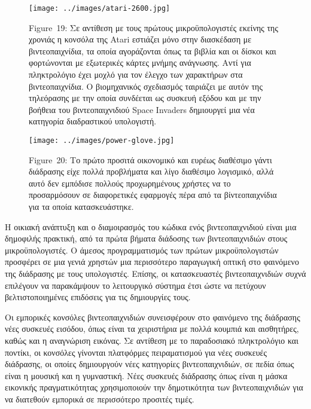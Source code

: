 \documentclass[
]{article}
\begin{document}
\leavevmode{}%
\begin{figure}
\hypertarget{fig:atari-2600}{%
\centering
\texttt{[image: ../images/atari-2600.jpg]}
\caption{Figure~19: Σε αντίθεση με τους πρώτους μικροϋπολογιστές εκείνης
της χρονιάς η κονσόλα της Atari εστιάζει μόνο στην διασκέδαση με
βιντεοπαιχνίδια, τα οποία αγοράζονται όπως τα βιβλία και οι δίσκοι και
φορτώνονται με εξωτερικές κάρτες μνήμης ανάγνωσης. Αντί για πληκτρολόγιο
έχει μοχλό για τον έλεγχο των χαρακτήρων στα βιντεοπαιχνίδια. Ο
βιομηχανικός σχεδιασμός ταιριάζει με αυτόν της τηλεόρασης με την οποία
συνδέεται ως συσκευή εξόδου και με την βοήθεια του βιντεοπαιχνιδιού
Space Invaders δημιουργεί μια νέα κατηγορία διαδραστικού
υπολογιστή.}\label{fig:atari-2600}
}
\end{figure}

\leavevmode{}%
\begin{figure}
\hypertarget{fig:power-glove}{%
\centering
\texttt{[image: ../images/power-glove.jpg]}
\caption{Figure~20: Το πρώτο προσιτά οικονομικό και ευρέως διαθέσιμο
γάντι διάδρασης είχε πολλά προβλήματα και λίγο διαθέσιμο λογισμικό, αλλά
αυτό δεν εμπόδισε πολλούς προχωρημένους χρήστες να το προσαρμόσουν σε
διαφορετικές εφαρμογές πέρα από τα βίντεοπαιχνίδια για τα οποία
κατασκευάστηκε.}\label{fig:power-glove}
}
\end{figure}

Η οικιακή ανάπτυξη και ο διαμοιρασμός του κώδικα ενός βιντεοπαιχνιδιού
είναι μια δημοφιλής πρακτική, από τα πρώτα βήματα διάδοσης των
βιντεοπαιχνιδιών στους μικροϋπολογιστές. Ο άμεσος προγραμματισμός των
πρώτων μικροϋπολογιστών προσφέρει σε μια γενιά χρηστών μια περισσότερο
παραγωγική οπτική στο φαινόμενο της διάδρασης με τους υπολογιστές.
Επίσης, οι κατασκευαστές βιντεοπαιχνιδιών συχνά επιλέγουν να παρακάμψουν
το λειτουργικό σύστημα έτσι ώστε να πετύχουν βελτιστοποιημένες επιδόσεις
για τις δημιουργίες τους.

Οι εμπορικές κονσόλες βιντεοπαιχνιδιών συνεισφέρουν στο φαινόμενο της
διάδρασης νέες συσκευές εισόδου, όπως είναι τα χειριστήρια με πολλά
κουμπιά και αισθητήρες, καθώς και η αναγνώριση εικόνας. Σε αντίθεση με
το παραδοσιακό πληκτρολόγιο και ποντίκι, οι κονσόλες γίνονται πλατφόρμες
πειραματισμού για νέες συσκευές διάδρασης, οι οποίες δημιουργούν νέες
κατηγορίες βιντεοπαιχνιδιών, σε πεδία όπως είναι η μουσική και η
γυμναστική. Νέες συσκευές διάδρασης όπως είναι η μάσκα εικονικής
πραγματικότητας χρησιμοποιούν την δημοτικότητα των βιντεοπαιχνιδιών για
να διατεθούν εμπορικά σε περισσότερο προσιτές τιμές.
\end{document}
